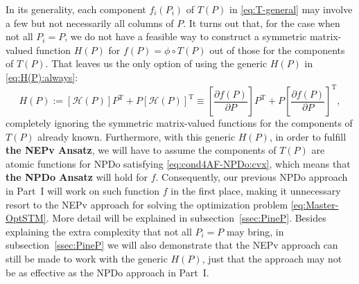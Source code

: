 \documentclass[11pt]{article}
\def\scrH{\mathscr{H}}
\DeclareMathOperator{\T}{T}
\theoremstyle{definition}
\numberwithin{equation}{section}
\begin{document}
In its generality, each component $f_i(P_i)$ of $T(P)$ in  \eqref{eq:T-general} may involve a few but not necessarily
all columns of $P$.
It turns out that, for the case when not all $P_i=P$, we do not have a feasible way to construct
a symmetric matrix-valued function $H(P)$  for $f(P)=\phi\circ T(P)$ out of those for the components of $T(P)$.
That leaves us the only option of using the generic $H(P)$ in \eqref{eq:H(P):always}:
$$
H(P):=[\scrH(P)]P^{\T}+P[\scrH(P)]^{\T}
  \equiv\left[\frac{\partial f(P)}{\partial P}\right] P^{\T}+P\left[\frac{\partial f(P)}{\partial P}\right]^{\T},
$$
completely ignoring the symmetric matrix-valued functions for the components of $T(P)$ already known. Furthermore, with this generic
$H(P)$, in order to fulfill {\bf the NEPv Ansatz}, we will have to assume the components of
$T(P)$ are atomic functions for NPDo satisfying \eqref{eq:cond4AF-NPDo:cvx},
which means that {\bf the NPDo Ansatz} will hold for $f$. Consequently, our previous NPDo approach in Part~I will work
on such function $f$ in the first place, making it unnecessary resort to the NEPv approach for solving
the optimization problem \eqref{eq:Master-OptSTM}. More detail will be explained in subsection~\ref{ssec:PineP}.
Besides explaining the extra complexity that not all $P_i=P$ may bring, in subsection~\ref{ssec:PineP} we will also demonstrate that
the NEPv approach can still be made to work with the generic $H(P)$, just that the approach may not be as effective as the NPDo approach in Part~I.
\end{document}
